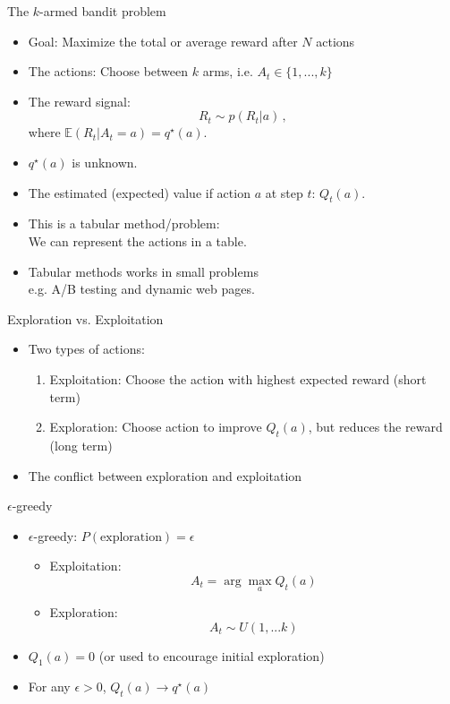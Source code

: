 \documentclass[10pt]{beamer}
\begin{document}
\begin{frame}{The $k$-armed bandit problem}

\begin{itemize}
\item {\color{uured} Goal}: Maximize the total or average reward after $N$ actions\pause
\item {\color{uured} The actions}: Choose between $k$ arms, i.e. $A_t \in \{1,...,k \}$\pause
\item The reward signal:
\[
R_{t} \sim p(R_t|a)\,,
\]
where $\mathbb{E}(R_{t}|A_t = a) = q^\star(a)$.\pause
\item $q^\star(a)$ is {\color{uured} unknown}.\pause
\item The estimated (expected) value if action $a$ at step $t$: $Q_t(a)$.\pause\vspace{3mm}
\item This is a {\color{uured} tabular} method/problem: \\ We can represent the actions in a table.
\item Tabular methods works in small problems\\ e.g. A/B testing and dynamic web pages.
\end{itemize}

\end{frame}

\begin{frame}{Exploration vs. Exploitation}

\begin{itemize}
\item Two types of actions:
\begin{enumerate}
\item Exploitation: Choose the action with highest expected reward (short term)
\item Exploration: Choose action to improve $Q_t(a)$, but reduces the reward (long term)
\end{enumerate}
\item The {\color{uured} conflict} between exploration and exploitation
\end{itemize}

\end{frame}


\begin{frame}{$\epsilon$-greedy}

\begin{itemize}
\item $\epsilon$-greedy: $P(\text{exploration}) = \epsilon$ \pause
\begin{itemize}
\item Exploitation:
\[
A_t = \arg \max_a Q_t(a)
\]
\pause
\item Exploration:
\[
A_t \sim U(1,...k)
\]
\pause
\end{itemize}
\item $Q_1(a) = 0$ (or used to encourage initial exploration)\pause
\item For any $\epsilon > 0$, $Q_t(a) \rightarrow q^\star(a)$
\end{itemize}

\end{frame}
\end{document}
